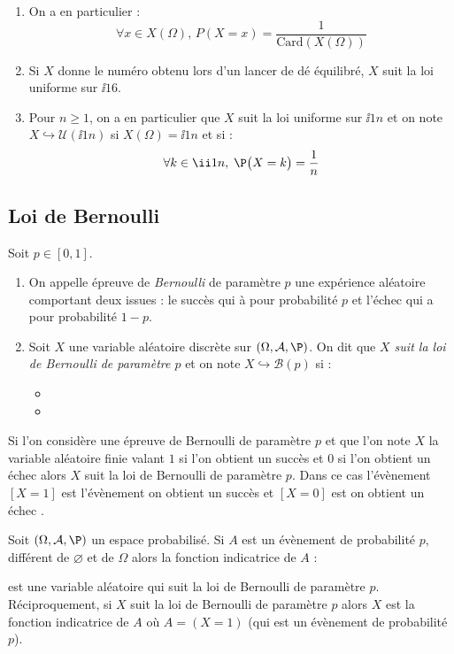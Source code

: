 \documentclass[french,11pt,twoside]{VcCours}
\begin{document}
\begin{Exemples}{}
\begin{enumerate}
\item On a en particulier :
$$ \forall x \in X(\Omega), \, P(X=x) = \dfrac{1}{\textrm{Card}(X(\Omega))}$$
\item Si $X$ donne le numéro obtenu lors d'un lancer de dé équilibré, $X$ suit la loi uniforme sur $\ii{1}{6}$.
\item Pour $n \geq 1$, on a en particulier que $X$ suit la loi uniforme sur $\ii 1n$ et on note $X \hookrightarrow \mathcal{U}(\ii 1n)$ si $X(\Omega)= \ii 1n$ et si :
 $$ \forall k \in \ii 1n,\; \P\big(X=k\big)=  \frac 1n $$
\end{enumerate}
\end{Exemples}
\subsection{Loi de Bernoulli}
\begin{Definition}{}
Soit $p \in [0,1]$.
\begin{enumerate}
\item On appelle épreuve de \emph{Bernoulli} de paramètre $p$ une expérience aléatoire comportant deux issues : le succès qui à pour probabilité $p$ et l'échec qui a pour probabilité $1-p$.
\item Soit $X$ une variable aléatoire discrète sur $(\Omega, \mathcal{A},\P)$. On dit que \emph{$X$ suit la loi de Bernoulli de paramètre $p$} et on note $X \hookrightarrow \mathcal{B}(p)$ si :
\begin{itemize}
 \item {}
 \item \phantom{$ \P\big(X=1\big)= p$ et $\P\big(X=0\big)=1-p$.}
\end{itemize}
\end{enumerate}
\end{Definition}

Si l'on considère une épreuve de Bernoulli de paramètre $p$ et que l'on note $X$ la variable aléatoire finie valant $1$ si l'on obtient un succès et $0$ si l'on obtient un échec alors $X$ suit la loi de Bernoulli de paramètre $p$. Dans ce cas l'évènement $[X=1]$ est l'évènement \og on obtient un succès \fg et $[X=0]$ est \og on obtient un échec \fg .

\begin{Remarque}{} Soit $(\Omega, \mathcal{A}, \P)$ un espace probabilisé. Si $A$ est un évènement de probabilité $p$, différent de $\varnothing$ et de $\Omega$ alors la fonction indicatrice de $A$ :

\vspace*{2cm}

est une variable aléatoire qui suit la loi de Bernoulli de paramètre $p$. Réciproquement, si $X$ suit la loi de Bernoulli de paramètre $p$ alors $X$ est la fonction indicatrice de $A$ où $A=(X=1)$ (qui est un évènement de probabilité $p$).
\end{Remarque}
\end{document}
